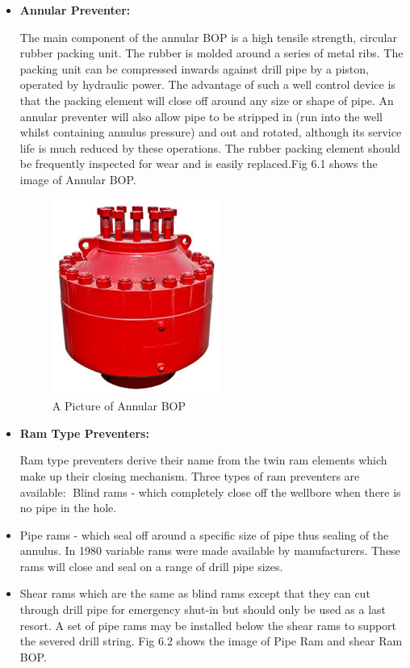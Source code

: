 \begin{itemize}
\item \textbf{Annular Preventer:}

 The main component of the
annular BOP is a high tensile strength, circular rubber
packing unit. The rubber is molded around a series of
metal ribs. The packing unit can be compressed
inwards against drill pipe by a piston, operated by
hydraulic power. The advantage of such a well
control device is that the packing element will close
off around any size or shape of pipe. An annular
preventer will also allow pipe to be stripped in (run
into the well whilst containing annulus pressure) and
out and rotated, although its service life is much
reduced by these operations. The rubber packing
element should be frequently inspected for wear and
is easily replaced.Fig 6.1 shows the image of Annular BOP.

\vspace{1em}

\begin{figure}[h]
\includegraphics[scale=0.4]{images/bopannular}
\centering
\caption{A Picture of Annular BOP}
\end{figure}

\item \textbf{Ram Type Preventers:}

Ram type preventers derive their name from the twin ram elements which make up their closing mechanism. 
Three types of ram preventers are available: Blind rams - which completely close off the wellbore when 
there is no pipe in the hole.

\vspace{1em}

\end{itemize}

\begin{itemize}

\item Pipe rams - which seal off around a specific size of pipe thus
sealing of the annulus. In 1980 variable rams were made
available by manufacturers. These rams will close and seal on a
range of drill pipe sizes.


\item Shear rams which are the same as blind rams except that they
can cut through drill pipe for emergency shut-in but should only
be used as a last resort. A set of pipe rams may be installed
below the shear rams to support the severed drill string. Fig 6.2 shows the image of Pipe Ram and shear Ram BOP.

\end{itemize}


